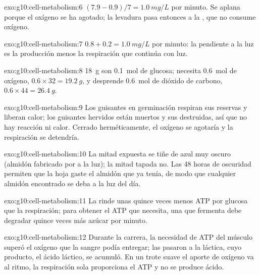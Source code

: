 \begin{solution}{exo:g10:cell-metabolism:6}
$(7.9 - 0.9)/7 = \qty{1.0}{mg/L}$ por minuto. Se aplana porque el
oxígeno se ha agotado; la levadura pasa entonces a la , que
no consume oxígeno.
\end{solution}

\begin{solution}{exo:g10:cell-metabolism:7}
$0.8 + 0.2 = \qty{1.0}{mg/L}$ por minuto: la pendiente a la luz es la
producción menos la respiración que continúa con luz.
\end{solution}

\begin{solution}{exo:g10:cell-metabolism:8}
\qty{18}{g} son \qty{0.1}{mol} de glucosa; necesita \qty{0.6}{mol} de
oxígeno, $0.6 \times 32 = \qty{19.2}{g}$, y desprende \qty{0.6}{mol} de
dióxido de carbono, $0.6 \times 44 = \qty{26.4}{g}$.
\end{solution}

\begin{solution}{exo:g10:cell-metabolism:9}
Los guisantes en germinación respiran sus reservas y liberan calor; los
guisantes hervidos están muertos y sus  destruidas, así que no
hay reacción ni calor. Cerrado herméticamente, el oxígeno se agotaría y
la respiración se detendría.
\end{solution}

\begin{solution}{exo:g10:cell-metabolism:10}
La mitad expuesta se tiñe de azul muy oscuro (almidón fabricado por
 a la luz); la mitad tapada no. Las 48 horas de oscuridad
permiten que la hoja gaste el almidón que ya tenía, de modo que
cualquier almidón encontrado se deba a la luz del día.
\end{solution}

\begin{solution}{exo:g10:cell-metabolism:11}
La  rinde unas quince veces menos ATP por glucosa que la
respiración; para obtener el ATP que necesita, una  que fermenta
debe degradar quince veces más azúcar por minuto.
\end{solution}

\begin{solution}{exo:g10:cell-metabolism:12}
Durante la carrera, la necesidad de ATP del músculo superó el oxígeno
que la sangre podía entregar; las  pasaron a la 
láctica, cuyo producto, el ácido láctico, se acumuló. En un trote suave
el aporte de oxígeno va al ritmo, la respiración sola proporciona el
ATP y no se produce ácido.
\end{solution}

